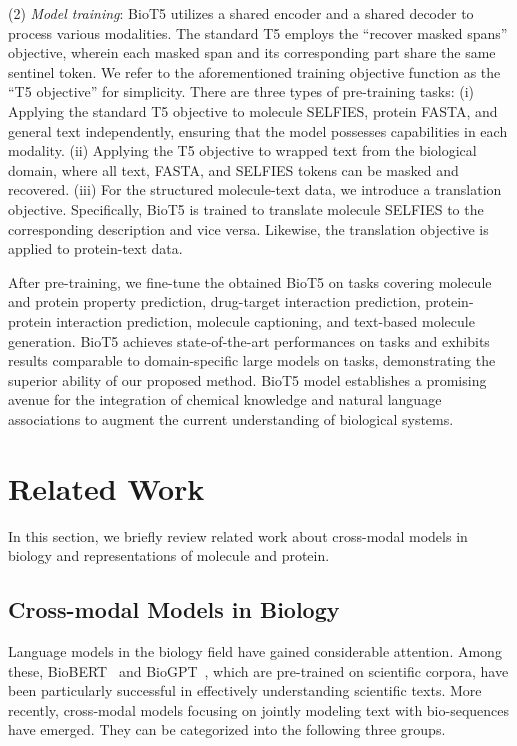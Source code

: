 \documentclass[11pt]{article}
\newcommand{\method}{{BioT5}}
\begin{document}
(2) {\em Model training}: \method{} utilizes a shared encoder and a shared decoder to process various modalities. The standard T5 employs the ``recover masked spans'' objective, wherein each masked span and its corresponding part share the same sentinel token. We refer to the aforementioned training objective function as the ``T5 objective'' for simplicity. There are three types of pre-training tasks: (i) Applying the standard T5 objective to molecule SELFIES, protein FASTA, and general text independently, ensuring that the model possesses capabilities in each modality. (ii) Applying the T5 objective to wrapped text from the biological domain, where all text, FASTA, and SELFIES tokens can be masked and recovered. (iii) For the structured molecule-text data, we introduce a translation objective. Specifically, \method{} is trained to translate molecule SELFIES to the corresponding description and vice versa. Likewise, the translation objective is applied to protein-text data. 

After pre-training, we fine-tune the obtained \method{} on  tasks covering molecule and protein property prediction, drug-target interaction prediction, protein-protein interaction prediction, molecule captioning, and text-based molecule generation. \method{} achieves state-of-the-art performances on  tasks and exhibits results comparable to domain-specific large models on  tasks, demonstrating the superior ability of our proposed method. 
\method{} model establishes a promising avenue for the integration of chemical knowledge and natural language associations to augment the current understanding of biological systems.


\section{Related Work}
In this section, we briefly review related work about cross-modal models in biology and representations of molecule and protein.

\subsection{Cross-modal Models in Biology}
\label{sec:cross_modal}
Language models in the biology field have gained considerable attention.
Among these, BioBERT~\citep{lee2020biobert} and BioGPT~\citep{luo2022biogpt}, which are pre-trained on scientific corpora, have been particularly successful in effectively understanding scientific texts.
More recently, cross-modal models focusing on jointly modeling text with bio-sequences have emerged.
They can be categorized into the following three groups.
\end{document}
